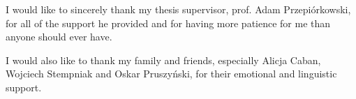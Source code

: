 I would like to sincerely thank my thesis supervisor, prof. Adam Przepiórkowski, for all of the support he provided and for having more patience for me than anyone should ever have.

I would also like to thank my family and friends, especially Alicja Caban, Wojciech Stempniak and Oskar Pruszyński, for their emotional and linguistic support. 
